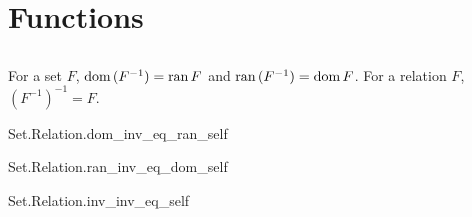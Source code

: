 \documentclass{report}
\begin{document}
\section{Functions}%

\subsection{}%

  \begin{theorem}[3E]
    For a set $F$, $\mathop{\text{dom}}{(F^{-1})} = \mathop{\text{ran}}{F}$ and $\mathop{\text{ran}}{(F^{-1})} = \mathop{\text{dom}}{F}$.
    For a relation $F$, $(F^{-1})^{-1} = F$.
  \end{theorem}

    {Set.Relation.dom\_inv\_eq\_ran\_self}

    {Set.Relation.ran\_inv\_eq\_dom\_self}

    {Set.Relation.inv\_inv\_eq\_self}
\end{document}

